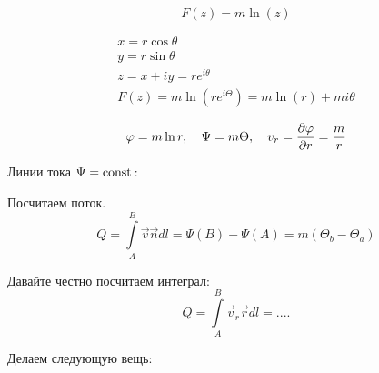 \begin{equation}
	F(z)=m\ln(z)
\end{equation}
\begin{comment}
     |y
   ______*  
  /     /\
 /     /  \
/     / t  \
-----*--------->x
\          /
 \        /
  \______/
\end{comment}
\begin{gather}
	\label{eqss}
	x=r\cos\theta\\
	y=r\sin\theta\\
	z=x+iy=re^{i\theta}\\
	F(z)=m\ln(re^{i\Theta})=m\ln(r)+mi\theta
\end{gather}
\begin{comment}
Принцип действия логарифмической линейки
 ______________________________________
|_.__.__.___.___.____._____.____.______| ln x
	 ______________________________________
	|_.__.__.___.___.____._____.____.______| шкала произведения
 ______________________________________
|_.__.__.___.___.____._____.____.______| ln y

x*y
x+y

lnx+lny=ln(xy)
\end{comment}

\begin{equation}
	\varphi=m\ln{r}, \quad \Psi=m\Theta, \quad v_r=\pdv{\varphi}{r}=\frac{m}{r}
\end{equation}

Линии тока $\Psi=\mathrm{const}\,$:

\begin{comment}
	Тут короче кружочек с радальными стрелочками из центра
\end{comment}

Посчитаем поток. 
\begin{equation}
	Q=\int\limits_{A}^{B} \vec{v}\vec{n}dl=\Psi(B)-\Psi(A)=m(\Theta_b-\Theta_a)
\end{equation}

Давайте честно посчитаем интеграл:
\begin{equation}
	Q=\int\limits_{A}^{B} \vec{v}_r\vec{r}dl=.... %
\end{equation}

Делаем следующую вещь:
\begin{comment}
окружность, кривулька два раза по окружности:
   ______
  //----\\
 //      \\
//        \\
*          ||
\          //
 \        //
  \______//
  лень
\end{comment}


